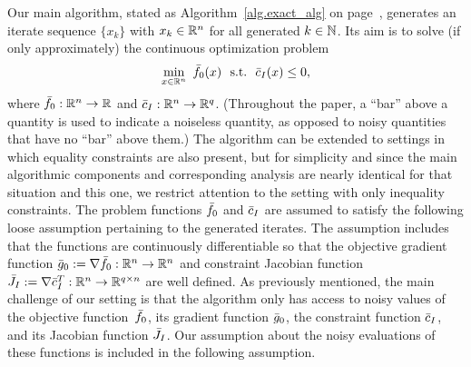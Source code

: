 Our main algorithm, stated as Algorithm~\ref{alg.exact_alg} on page~\pageref{alg.exact_alg}, generates an iterate sequence $\{x_k\}$ with $x_k \in \mathbb{R}^n$ for all generated $k \in \mathbb{N}$.  Its aim is to solve (if only approximately) the continuous optimization problem
\begin{equation}\label{eq.main_problem}
  \min_{x \in \mathbb{R}^n}\ {\bar f}_0(x)\ \ \text{s.t.} \ \ {\bar c}_I(x) \leq 0,
\end{equation}
where ${\bar f}_0: \mathbb{R}^n \to \mathbb{R}$ and ${\bar c}_I: \mathbb{R}^n \to \mathbb{R}^q$.  (Throughout the paper, a ``bar'' above a quantity is used to indicate a noiseless quantity, as opposed to noisy quantities that have no ``bar'' above them.)  The algorithm can be extended to settings in which equality constraints are also present, but for simplicity and since the main algorithmic components and corresponding analysis are nearly identical for that situation and this one, we restrict attention to the setting with only inequality constraints.  The problem functions ${\bar f}_0$ and ${\bar c}_I$ are assumed to satisfy the following loose assumption pertaining to the generated iterates.  The assumption includes that the functions are continuously differentiable so that the objective gradient function ${\bar g}_0 := \nabla {\bar f}_0 : \mathbb{R}^n \to \mathbb{R}^n$ and constraint Jacobian function ${\bar J}_I := \nabla {\bar c}_I^T : \mathbb{R}^n \to \mathbb{R}^{q \times n}$ are well defined.  As previously mentioned, the main challenge of our setting is that the algorithm only has access to noisy values of the objective function~${\bar f}_0$, its gradient function ${\bar g}_0$, the constraint function ${\bar c}_I$, and its Jacobian function ${\bar J}_I$.  Our assumption about the noisy evaluations of these functions is included in the following assumption.

